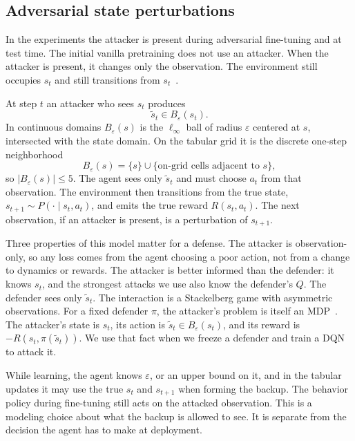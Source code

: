 \documentclass[10pt,twocolumn]{article}
\begin{document}
\subsection{Adversarial state perturbations}
\label{sec:threat}

In the experiments the attacker is present during adversarial fine-tuning and at test time.
The initial vanilla pretraining does not use an attacker.
When the attacker is present, it changes only the observation.
The environment still occupies $s_t$ and still transitions from $s_t$~\cite{huang2017adversarial,zhang2020robust,sun2024belief}.

At step $t$ an attacker who sees $s_t$ produces
\begin{equation}
\tilde s_t \in B_\varepsilon(s_t).
\label{eq:ball}
\end{equation}
In continuous domains $B_\varepsilon(s)$ is the $\ell_\infty$ ball of radius $\varepsilon$ centered at $s$, intersected with the state domain.
On the tabular grid it is the discrete one-step neighborhood
\[
B_\varepsilon(s)=\{s\}\cup\{\text{on-grid cells adjacent to }s\},
\]
so $|B_\varepsilon(s)|\le 5$.
The agent sees only $\tilde s_t$ and must choose $a_t$ from that observation.
The environment then transitions from the true state, $s_{t+1}\sim P(\cdot\mid s_t,a_t)$, and emits the true reward $R(s_t,a_t)$.
The next observation, if an attacker is present, is a perturbation of $s_{t+1}$.

Three properties of this model matter for a defense.
The attacker is observation-only, so any loss comes from the agent choosing a poor action, not from a change to dynamics or rewards.
The attacker is better informed than the defender: it knows $s_t$, and the strongest attacks we use also know the defender's $Q$.
The defender sees only $\tilde s_t$.
The interaction is a Stackelberg game with asymmetric observations.
For a fixed defender $\pi$, the attacker's problem is itself an MDP~\cite{zhang2021robust,sun2024belief}.
The attacker's state is $s_t$, its action is $\tilde s_t\in B_\varepsilon(s_t)$, and its reward is $-R(s_t,\pi(\tilde s_t))$.
We use that fact when we freeze a defender and train a DQN to attack it.

While learning, the agent knows $\varepsilon$, or an upper bound on it, and in the tabular updates it may use the true $s_t$ and $s_{t+1}$ when forming the backup.
The behavior policy during fine-tuning still acts on the attacked observation.
This is a modeling choice about what the backup is allowed to see.
It is separate from the decision the agent has to make at deployment.
\end{document}

